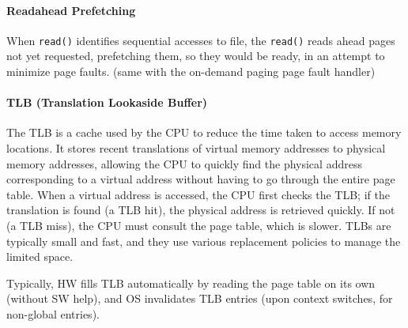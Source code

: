 \documentclass[openany,12pt]{book}
\newcommand{\code}[1]{\texttt{#1}}
\begin{document}
\paragraph{Readahead Prefetching} When \code{read()} identifies sequential accesses to file, the \code{read()} reads ahead pages not yet requested, prefetching them, so they would be ready, in an attempt to minimize page faults. (same with the on-demand paging page fault handler)


\paragraph{TLB (Translation Lookaside Buffer)} The TLB is a cache used by the CPU to reduce the time taken to access memory locations. It stores recent translations of virtual memory addresses to physical memory addresses, allowing the CPU to quickly find the physical address corresponding to a virtual address without having to go through the entire page table. When a virtual address is accessed, the CPU first checks the TLB; if the translation is found (a TLB hit), the physical address is retrieved quickly. If not (a TLB miss), the CPU must consult the page table, which is slower. TLBs are typically small and fast, and they use various replacement policies to manage the limited space. 

Typically, HW fills TLB automatically by reading the page table on its own (without SW help), and OS invalidates TLB entries (upon context switches, for non-global entries).
\end{document}

